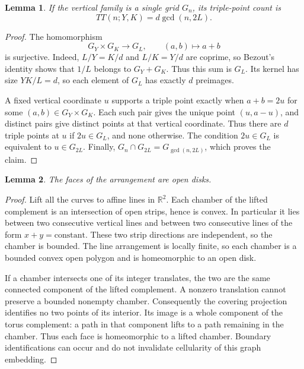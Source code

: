 \documentclass[a4paper,11pt]{article}
\newtheorem{lemma}{Lemma}
\begin{document}
\begin{lemma}\label{lem:triple}
If the vertical family is a single grid $G_n$, its triple-point count is
\[
 TT(n;Y,K)=d\gcd(n,2L).
\]
\end{lemma}
\begin{proof}
The homomorphism
\[
 G_Y\times G_K\longrightarrow G_L,\qquad (a,b)\longmapsto a+b
\]
is surjective. Indeed, $L/Y=K/d$ and $L/K=Y/d$ are coprime, so Bezout's
identity shows that $1/L$ belongs to $G_Y+G_K$. Thus this sum is $G_L$.
Its kernel has size $YK/L=d$, so each element of $G_L$ has exactly
$d$ preimages.

A fixed vertical coordinate $u$ supports a triple point exactly when
$a+b=2u$ for some $(a,b)\in G_Y\times G_K$. Each such pair gives the
unique point $(u,a-u)$, and distinct pairs give distinct points at that
vertical coordinate. Thus there are $d$ triple points at $u$ if
$2u\in G_L$, and none otherwise. The condition $2u\in G_L$ is equivalent
to $u\in G_{2L}$. Finally,
$G_n\cap G_{2L}=G_{\gcd(n,2L)}$, which proves the claim.
\end{proof}

\begin{lemma}\label{lem:cellular}
The faces of the arrangement are open disks.
\end{lemma}
\begin{proof}
Lift all the curves to affine lines in $\mathbb R^2$. Each chamber of the
lifted complement is an intersection of open strips, hence is convex.
In particular it lies between two consecutive vertical lines and between
two consecutive lines of the form $x+y=\text{constant}$. These two strip
directions are independent, so the chamber is bounded. The line
arrangement is locally finite, so each chamber is a bounded convex open
polygon and is homeomorphic to an open disk.

If a chamber intersects one of its integer translates, the two are the
same connected component of the lifted complement. A nonzero translation
cannot preserve a bounded nonempty chamber. Consequently the covering
projection identifies no two points of its interior. Its image is a
whole component of the torus complement: a path in that component lifts
to a path remaining in the chamber. Thus each face is homeomorphic to a
lifted chamber. Boundary identifications can occur and do not invalidate
cellularity of this graph embedding.
\end{proof}
\end{document}

